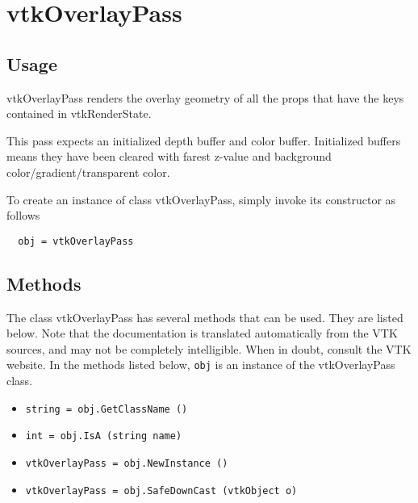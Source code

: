 \section{vtkOverlayPass}

\subsection{Usage}

 vtkOverlayPass renders the overlay geometry of all the props that have the
 keys contained in vtkRenderState.

 This pass expects an initialized depth buffer and color buffer.
 Initialized buffers means they have been cleared with farest z-value and
 background color/gradient/transparent color.
 

To create an instance of class vtkOverlayPass, simply
invoke its constructor as follows
\begin{verbatim}
  obj = vtkOverlayPass
\end{verbatim}
\subsection{Methods}

The class vtkOverlayPass has several methods that can be used.
  They are listed below.
Note that the documentation is translated automatically from the VTK sources,
and may not be completely intelligible.  When in doubt, consult the VTK website.
In the methods listed below, \verb|obj| is an instance of the vtkOverlayPass class.
\begin{itemize}
\item  \verb|string = obj.GetClassName ()|

\item  \verb|int = obj.IsA (string name)|

\item  \verb|vtkOverlayPass = obj.NewInstance ()|

\item  \verb|vtkOverlayPass = obj.SafeDownCast (vtkObject o)|

\end{itemize}
